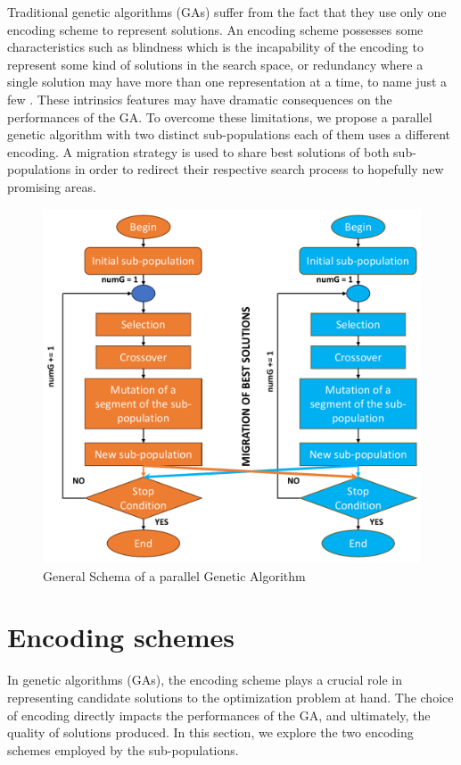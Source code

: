 \documentclass[review]{elsarticle}
\begin{document}
Traditional genetic algorithms (GAs) suffer from the fact that they use only one encoding scheme to represent solutions. An encoding scheme possesses some characteristics such as blindness which is the incapability of the encoding to represent some kind of solutions in the search space, or redundancy where a single solution may have more than one representation at a time, to name just a few \cite{rothlauf_goldberg_2003}. These intrinsics features may have dramatic consequences on the performances of the GA. 
To overcome these limitations, we propose a parallel genetic algorithm with two distinct sub-populations each of them uses a different encoding. A migration strategy is used to share best solutions of both sub-populations in order to redirect their respective search process to hopefully new promising areas.
\begin{center}
	\begin{figure}[H]
		\centering
		\includegraphics[scale=0.6]{figurePaper/parallelGA.pdf} 
		\caption{\label{Fig1: Figure 1} General Schema of a parallel Genetic Algorithm}
	\end{figure}
\end{center}

\section{Encoding schemes}
In genetic algorithms (GAs), the encoding scheme plays a crucial role in representing candidate solutions to the optimization problem at hand. The choice of encoding directly impacts the performances of the GA, and ultimately, the quality of solutions produced. In this section, we explore the two encoding schemes employed by the sub-populations.
\end{document}
